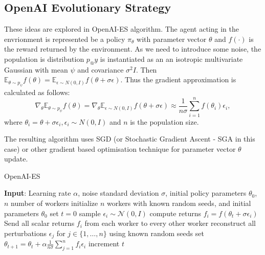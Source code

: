 \subsection{OpenAI Evolutionary Strategy}
\label{subsec:openai-es}
These ideas are explored in OpenAI-ES algorithm. The agent acting in the envrionment is represented be a policy $\pi_\theta$  with parameter vector $\theta$ and $f(\cdot)$ is the reward returned by the environment. As we need to introduce some noise, the population is distribution $p_@y$ is instantiated as an an isotropic multivariate Gaussian with mean $\psi$ and covariance $\sigma^2I$. Then $\mathbb{E}_{\theta\sim p_\psi}f(\theta) = \mathbb{E}_{\epsilon\sim N(0,I)}f(\theta+\sigma\epsilon)$. Thus the gradient approximation is calculated as follows:
\begin{equation}
    \nabla_{\theta}\mathbb{E}_{\theta\sim p_\psi}f(\theta) =\nabla_{\theta}\mathbb{E}_{\epsilon\sim N(0,I)}f(\theta+\sigma\epsilon)\approx \frac{1}{n\sigma}\sum_{i=1}^n f(\theta_i)\epsilon_i,  
\end{equation}
where $\theta_i = \theta + \sigma\epsilon_i, \epsilon_i\sim N(0,I)$ and $n$ is the population size.

The resulting algorithm uses SGD (or Stochastic Gradient Ascent - SGA in this case) or other gradient based optimisation technique for parameter vector $\theta$ update.

\begin{algorithm}
    \begin{algorithmic}[1]
    \caption{OpenAI-ES}
    \label{alg:openai-es}
        \State \textbf{Input}: Learning rate $\alpha$, noise standard deviation $\sigma$, initial policy parameters $\theta_0$, $n$ number of workers
        \State initialize $n$ workers with known random seeds, and initial parameters $\theta_0$
        \State set $t=0$
        \Repeat
                \State sample $\epsilon_i \sim \mathcal{N}(0,I)$ 
                \State compute returns $f_i = f(\theta_t+\sigma\epsilon_i)$
            \EndFor
            \State Send all scalar returns $f_i$ from each worker to every other worker
                \State reconstruct all perturbations $\epsilon_j $ for $j \in \{1,\dots,n\}$ using known random seeds
                \State set $\theta_{t+1} = \theta_t + \alpha \frac{1}{n\sigma}\sum_{j=1}^nf_i\epsilon_i$
            \EndFor
            \State increment $t$
    \end{algorithmic}
\end{algorithm}

